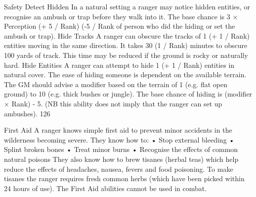 \documentclass[a4paper]{article}
\begin{document}
\begin{multicols}{3}
Safety
Detect Hidden In a natural setting a ranger may
notice hidden entities, or recognise an ambush or
trap before they walk into it. The base chance is 3
× Perception (+ 5 / Rank) (-5 / Rank of person who
did the hiding or set the ambush or trap).
Hide Tracks A ranger can obscure the tracks of 1
(+ 1 / Rank) entities moving in the same direction.
It takes 30 (1 / Rank) minutes to obscure 100 yards
of track. This time may be reduced if the ground is
rocky or naturally hard.
Hide Entities A ranger can attempt to hide 1 (+ 1 /
Rank) entities in natural cover. The ease of hiding
someone is dependent on the available terrain. The
GM should advise a modifier based on the terrain
of 1 (e.g. flat open ground) to 10 (e.g. thick bushes
or jungle). The base chance of hiding is (modifier ×
Rank) - 5. (NB this ability does not imply that the
ranger can set up ambushes).
126

First Aid A ranger knows simple first aid to prevent minor accidents in the wilderness becoming
severe. They know how to:
• Stop external bleeding
• Splint broken bones
• Treat minor burns
• Recognise the effects of common natural poisons
They also know how to brew tisanes (herbal teas)
which help reduce the effects of headaches, nausea,
fevers and food poisoning. To make tisanes the
ranger requires fresh common herbs (which have
been picked within 24 hours of use).
The First Aid abilities cannot be used in combat.


\end{multicols}
\end{document}

